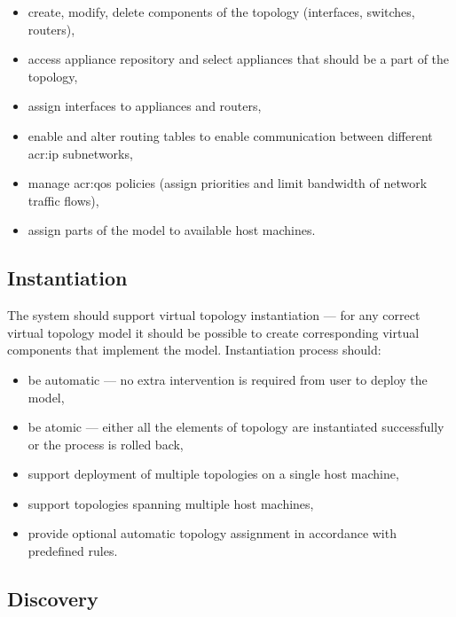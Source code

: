 \documentclass[11pt,openany]{book}
\begin{document}
        \begin{itemize}
          \item create, modify, delete components of the topology (interfaces, switches, routers),
          \item access appliance repository and select appliances that should be a part of the topology,
          \item assign interfaces to appliances and routers,
          \item enable and alter routing tables to enable communication between different \gls{acr:ip} subnetworks,
          \item manage \gls{acr:qos} policies (assign priorities and limit bandwidth of network traffic flows),
          \item assign parts of the model to available host machines.
        \end{itemize}


      \subsection{Instantiation}
      \label{sec:req:func:inst}

        The system should support virtual topology instantiation --- for any correct virtual topology model it should be
        possible to create corresponding virtual components that implement the model. Instantiation process should:

        \begin{itemize}
          \item be automatic --- no extra intervention is required from user to deploy the model,
          \item be atomic --- either all the elements of topology are instantiated successfully or the process is rolled
                back,
          \item support deployment of multiple topologies on a single host machine,
          \item support topologies spanning multiple host machines,
          \item provide optional automatic topology assignment in accordance with predefined rules.
        \end{itemize}


      \subsection{Discovery}
      \label{sec:req:func:disc}
\end{document}
